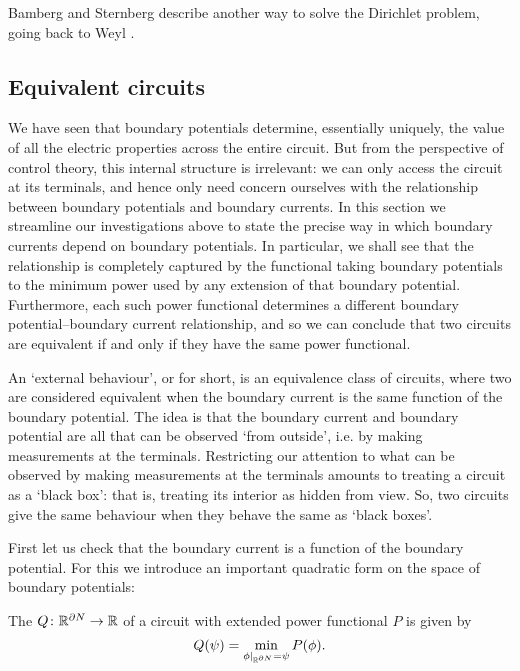 Bamberg and Sternberg \cite{BS} describe another way to solve the Dirichlet problem, going back to Weyl \cite{Weyl}.

\subsection{Equivalent circuits}

We have seen that boundary potentials determine, essentially uniquely, the value of all the electric properties across the entire circuit. But from the perspective of control theory, this internal structure is irrelevant: we can only access the circuit at its terminals, and hence only need concern ourselves with the relationship between boundary potentials and boundary currents. In this section we streamline our investigations above to state the precise way in which boundary currents depend on boundary potentials. In particular, we shall see that the relationship is completely captured by the functional taking boundary potentials to the minimum power used by any extension of that boundary potential. Furthermore, each such power functional determines a different boundary potential--boundary current relationship, and so we can conclude that two circuits are equivalent if and only if they have the same power functional. 

An `external behaviour', or  for short, is an equivalence class of circuits, where two are considered equivalent when the boundary current is the same function of the boundary potential. The idea is that the boundary current and boundary potential are all that can be observed `from outside', i.e. by making measurements at the terminals.  Restricting our attention to what can be observed by making measurements at the terminals amounts to treating a circuit as a `black box': that is, treating its interior as hidden from view.  So, two circuits give the same behaviour when they behave the same as `black boxes'.

First let us check that the boundary current is a function of the boundary potential.  For this we introduce an important quadratic form on the space of boundary potentials:

\begin{definition}
The  $Q {\colon} {\mathbb{R}}^{\partial N} \to {\mathbb{R}}$ of a circuit with extended power functional $P$ is given by
\[
 Q(\psi) = \min_{\phi|_{{\mathbb{R}}^{\partial N}} = \psi } P(\phi).
\]
\end{definition}

